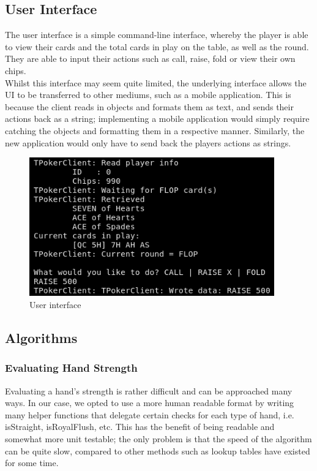 \documentclass[11pt]{article}
\begin{document}
\subsection{User Interface}

The user interface is a simple command-line interface, whereby the player is able to view their cards and the total cards in play on the table, as well as the round. They are able to input their actions such as call, raise, fold or view their own chips. \\

Whilst this interface may seem quite limited, the underlying interface allows the UI to be transferred to other mediums, such as a mobile application. This is because the client reads in objects and formats them as text, and sends their actions back as a string; implementing a mobile application would simply require catching the objects and formatting them in a respective manner. Similarly, the new application would only have to send back the players actions as strings.


\begin{figure}[h]
\begin{center}
\includegraphics[width=300pt]{ui}
\end{center}
\caption{User interface}
\end{figure}

\newpage


\subsection{Algorithms}
\subsubsection{Evaluating Hand Strength}
Evaluating a hand's strength is rather difficult and can be approached many ways. In our case, we opted to use a more human readable format by writing many helper functions that delegate certain checks for each type of hand, i.e. isStraight, isRoyalFlush, etc. This has the benefit of being readable and somewhat more unit testable; the only problem is that the speed of the algorithm can be quite slow, compared to other methods such as lookup tables have existed for some time. \cite{lookup} \\ %
\end{document}
